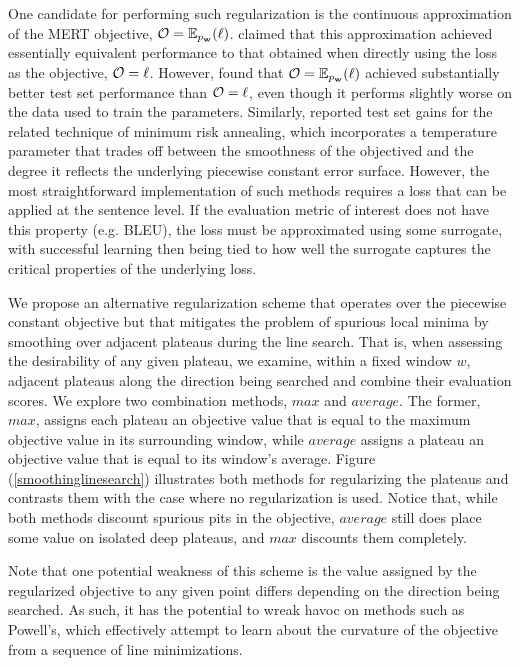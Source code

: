 \documentclass[11pt,tightenlines,kern-1pt]{article}
\begin{document}
One candidate for performing such regularization is the continuous approximation of the MERT objective, \mbox{${\cal O} = \mathbb{E}_{p_{\bf w}}({\ell})$}.  claimed that this approximation achieved essentially equivalent performance to that obtained when directly using the loss as the objective, \mbox{${\cal O} = \ell$}. However,  found that \mbox{${\cal O} = \mathbb{E}_{p_{\bf w}}({\ell})$} achieved substantially better test set performance than \mbox{${\cal O} = \ell$}, even though it performs slightly worse on the data used to train the parameters. Similarly,  reported test set gains for the related technique of minimum risk annealing, which incorporates a temperature parameter that trades off between the smoothness of the objectived and the degree it reflects the underlying piecewise constant error surface. 
However, the most straightforward implementation of such methods requires a loss that can be applied at the sentence level. If the evaluation metric of interest does not have this property (e.g. BLEU), the loss must be approximated using some surrogate, with successful learning then being tied to how well the surrogate captures the critical properties of the underlying loss.  

We propose an alternative regularization scheme that operates over the piecewise constant objective but that mitigates the problem of spurious local minima by smoothing over adjacent plateaus during the line search. That is, when assessing the desirability of any given plateau, we examine, within a fixed window \mbox{$w$}, adjacent plateaus along the direction being searched and combine their evaluation scores. We explore two combination methods, \mbox{$max$} and \mbox{$average$}. The former, \mbox{$max$}, assigns each plateau an objective value that is equal to the maximum objective value in its surrounding window, while \mbox{$average$} assigns a plateau an objective value that is equal to its window's average. Figure (\ref{smoothinglinesearch}) illustrates both methods for regularizing the plateaus and contrasts them with the case where no regularization is used. Notice that, while both methods discount spurious pits in the objective, \mbox{$average$} still does place some value on isolated deep plateaus, and \mbox{$max$} discounts them completely.

Note that one potential weakness of this scheme is the value assigned by the regularized objective to any given point differs depending on the direction being searched. As such, it has the potential to wreak havoc on methods such as Powell's, which effectively attempt to learn about the curvature of the objective from a sequence of line minimizations. 
\end{document}
